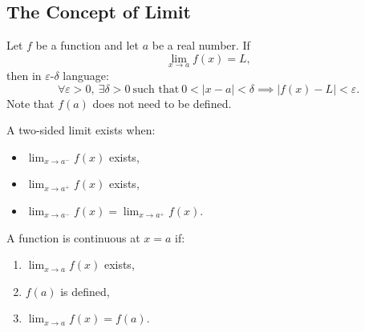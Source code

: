 \subsection{The Concept of Limit}

\begin{definition}[Limit]
Let $f$ be a function and let $a$ be a real number. If
\[
  \lim_{x\to a}f(x)=L,
\]
then in $\varepsilon$-$\delta$ language:
\[
  \forall\varepsilon>0,\ \exists\delta>0\ \text{such that}\ 0<|x-a|<\delta \implies |f(x)-L|<\varepsilon.
\]
Note that $f(a)$ does not need to be defined.

A two-sided limit exists when:
\begin{itemize}
  \item $\lim_{x\to a^-}f(x)$ exists,
  \item $\lim_{x\to a^+}f(x)$ exists,
  \item $\lim_{x\to a^-}f(x)=\lim_{x\to a^+}f(x)$.
\end{itemize}
\end{definition}

\begin{definition}[Continuity]
A function is continuous at $x=a$ if:
\begin{enumerate}
  \item $\lim_{x\to a}f(x)$ exists,
  \item $f(a)$ is defined,
  \item $\lim_{x\to a}f(x)=f(a)$.
\end{enumerate}
\end{definition}
